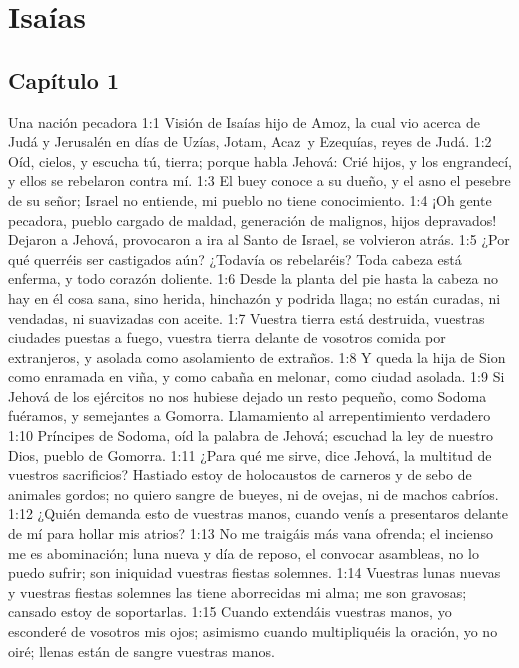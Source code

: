 \chapter{Isaías}

\section*{Capítulo 1 }


Una nación pecadora 
1:1 Visión de Isaías hijo de Amoz, la cual vio acerca de Judá y Jerusalén en días de Uzías, Jotam, Acaz y Ezequías, reyes de Judá. 
1:2 Oíd, cielos, y escucha tú, tierra; porque habla Jehová: Crié hijos, y los engrandecí, y ellos se rebelaron contra mí. 
1:3 El buey conoce a su dueño, y el asno el pesebre de su señor; Israel no entiende, mi pueblo no tiene conocimiento. 
1:4 ¡Oh gente pecadora, pueblo cargado de maldad, generación de malignos, hijos depravados! Dejaron a Jehová, provocaron a ira al Santo de Israel, se volvieron atrás. 
1:5 ¿Por qué querréis ser castigados aún? ¿Todavía os rebelaréis? Toda cabeza está enferma, y todo corazón doliente. 
1:6 Desde la planta del pie hasta la cabeza no hay en él cosa sana, sino herida, hinchazón y podrida llaga; no están curadas, ni vendadas, ni suavizadas con aceite. 
1:7 Vuestra tierra está destruida, vuestras ciudades puestas a fuego, vuestra tierra delante de vosotros comida por extranjeros, y asolada como asolamiento de extraños. 
1:8 Y queda la hija de Sion como enramada en viña, y como cabaña en melonar, como ciudad asolada. 
1:9 Si Jehová de los ejércitos no nos hubiese dejado un resto pequeño, como Sodoma fuéramos, y semejantes a Gomorra. 
Llamamiento al arrepentimiento verdadero 
1:10 Príncipes de Sodoma, oíd la palabra de Jehová; escuchad la ley de nuestro Dios, pueblo de Gomorra. 
1:11 ¿Para qué me sirve, dice Jehová, la multitud de vuestros sacrificios? Hastiado estoy de holocaustos de carneros y de sebo de animales gordos; no quiero sangre de bueyes, ni de ovejas, ni de machos cabríos. 
1:12 ¿Quién demanda esto de vuestras manos, cuando venís a presentaros delante de mí para hollar mis atrios? 
1:13 No me traigáis más vana ofrenda; el incienso me es abominación; luna nueva y día de reposo, el convocar asambleas, no lo puedo sufrir; son iniquidad vuestras fiestas solemnes. 
1:14 Vuestras lunas nuevas y vuestras fiestas solemnes las tiene aborrecidas mi alma; me son gravosas; cansado estoy de soportarlas.  
1:15 Cuando extendáis vuestras manos, yo esconderé de vosotros mis ojos; asimismo cuando multipliquéis la oración, yo no oiré; llenas están de sangre vuestras manos. 
